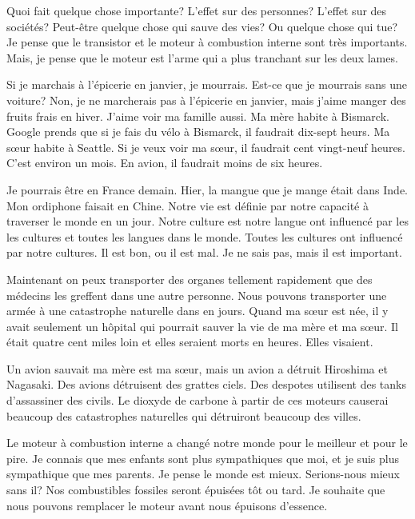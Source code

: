 \documentclass[letterpaper]{article}
\begin{document}
\doublespacing
Quoi fait quelque chose importante? L'effet sur des personnes? L'effet sur des sociétés? Peut-être quelque chose qui sauve des vies? Ou quelque chose qui tue? Je pense que le transistor et le moteur à combustion interne sont très importants. Mais, je pense que le moteur est l'arme qui a plus tranchant sur les deux lames.

Si je marchais à l'épicerie en janvier, je mourrais. Est-ce que je mourrais sans une voiture? Non, je ne marcherais pas à l'épicerie en janvier, mais j'aime manger des fruits frais en hiver. J'aime voir ma famille aussi. Ma mère habite à Bismarck. Google prends que si je fais du vélo à Bismarck, il faudrait dix-sept heurs. Ma sœur habite à Seattle. Si je veux voir ma sœur, il faudrait cent vingt-neuf heures. C'est environ un mois. En avion, il faudrait moins de six heures.

Je pourrais être en France demain. Hier, la mangue que je mange était dans Inde. Mon ordiphone faisait en Chine. Notre vie est définie par notre capacité à traverser le monde en un jour. Notre culture est notre langue ont influencé par les les cultures et toutes les langues dans le monde. Toutes les cultures ont influencé par notre cultures. Il est bon, ou il est mal. Je ne sais pas, mais il est important.

Maintenant on peux transporter des organes tellement rapidement que des médecins les greffent dans une autre personne. Nous pouvons transporter une armée à une catastrophe naturelle dans en jours. Quand ma sœur est née, il y avait seulement un hôpital qui pourrait sauver la vie de ma mère et ma sœur. Il était quatre cent miles loin et elles seraient morts en heures. Elles visaient.

Un avion sauvait ma mère est ma sœur, mais un avion a détruit Hiroshima et Nagasaki. Des avions détruisent des grattes ciels. Des despotes utilisent des tanks d'assassiner des civils. Le dioxyde de carbone à partir de ces moteurs causerai beaucoup des catastrophes naturelles qui détruiront beaucoup des villes.

Le moteur à combustion interne a changé notre monde pour le meilleur et pour le pire. Je connais que mes enfants sont plus sympathiques que moi, et je suis plus sympathique que mes parents. Je pense le monde est mieux. Serions-nous mieux sans il? Nos combustibles fossiles seront épuisées tôt ou tard. Je souhaite que nous pouvons remplacer le moteur avant nous épuisons d'essence.
\end{document}
